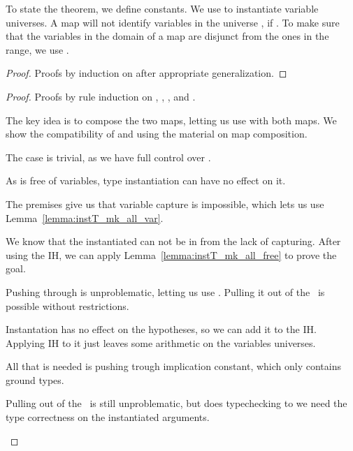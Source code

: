 To state the theorem, we define constants.
We use  to instantiate variable universes.
A map \isa{\(\sigma\)} will not identify variables in the universe , if .
To make sure that the variables in the domain of a map \isa{\(\sigma\)} are disjunct from the ones in the range, we use .


\begin{lemma}
\end{lemma}
\begin{lemma}
\end{lemma}
\begin{proof}
    Proofs by induction on  after appropriate generalization.
\end{proof}

\begin{theorem}
\end{theorem}
\begin{proof}
    Proofs by rule induction on \isa{\(\Gamma\)}, \isa{\(\Psi\)}, \isa{\(\Omega\)}, and .
    \begin{description}[]
        \item [\ax] The key idea is to compose the two maps, letting us use \ax with both maps. We show the compatibility of \isa{\(\Psi\)} and \isa{\(\Omega\)} using the material on map composition.
        \item [\as] The case is trivial, as we have full control over .
        \item [\wk] As  is free of variables, type instantiation can have no effect on it.
        \item [\aIv] The premises give us that variable capture is impossible, which lets us use Lemma~\ref{lemma:instT_mk_all_var}.
        \item [\aIf] We know that the instantiated  can not be in \isa{\(\Gamma\)} from the lack of capturing. After using the IH, we can apply Lemma~\ref{lemma:instT_mk_all_free} to prove the goal.
        \item [\aE] Pushing  through  is unproblematic, letting us use \aE. Pulling it out of the \isasymbullet\ is possible without restrictions.
        \item [\iI] Instantation has no effect on the hypotheses, so we can add it to the IH. Applying IH to it just leaves some arithmetic on the variables universes.
        \item [\iE] All that is needed is pushing  trough implication constant, which only contains ground types.
        \item [\bcnv] Pulling  out of the \isasymbullet\ is still unproblematic, but  does typechecking to we need the type correctness on the instantiated arguments.
    \end{description}
\end{proof}


